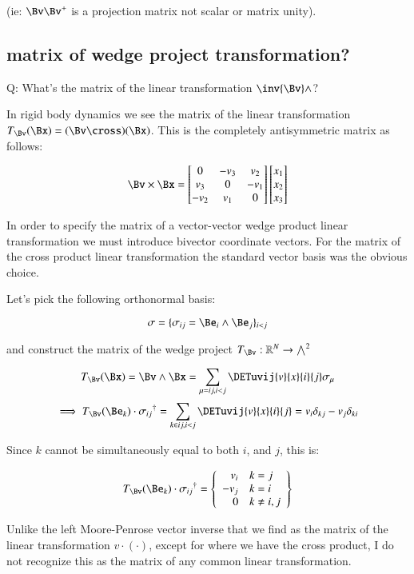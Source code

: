 (ie: $\Bv \Bv^{+}$ is a projection matrix not scalar or matrix unity).

\subsection{matrix of wedge project transformation? }

Q: What's the matrix of the linear transformation $\inv{\Bv} \wedge$?

In rigid body dynamics we see the matrix of the linear transformation $T_\Bv(\Bx) = (\Bv \cross)(\Bx)$.  This is the completely antisymmetric matrix as follows:

\begin{equation}
\Bv \times \Bx = 
\begin{bmatrix}
0 & -v_3 & v_2 \\
v_3 & 0 & -v_1 \\
-v_2 & v_1 & 0 \\
\end{bmatrix}
\begin{bmatrix}
x_1 \\
x_2 \\
x_3 \\
\end{bmatrix}
\end{equation}

In order to specify the matrix of a vector-vector wedge product linear transformation we must introduce bivector coordinate vectors.  For the matrix of the cross product linear transformation the standard vector basis was the obvious choice.

Let's pick the following orthonormal basis:

\[
\sigma = \{ \sigma_{ij} = \Be_i \wedge \Be_j \}_{i<j}
\]

and construct the matrix of the wedge project $T_\Bv : \mathbb{R}^N \rightarrow {\bigwedge}^2$

\[
T_\Bv(\Bx) = \Bv \wedge \Bx = \sum_{\mu = ij, i<j} \DETuvij{v}{x}{i}{j} \sigma_{\mu}
\]
\[
\implies
T_\Bv(\Be_k) \cdot {\sigma_{ij}}^\dagger = 
\sum_{k \in ij, i<j} \DETuvij{v}{x}{i}{j} 
= %
v_i \delta_{kj} - v_j \delta_{ki}
\]

Since $k$ cannot be simultaneously equal to both $i$, and $j$, this is:

\[
T_\Bv(\Be_k) \cdot {\sigma_{ij}}^\dagger = 
\left\{
\begin{array}{rl}
v_i & k=j \\
-v_j & k=i \\
0 & k \ne i,j \\
\end{array}
\right\}
\]

Unlike the left Moore-Penrose vector inverse that we find as the matrix of the linear transformation $v \cdot ( \cdot )$, except for  where we have the cross product, I do not recognize this as the matrix of any common linear transformation.

